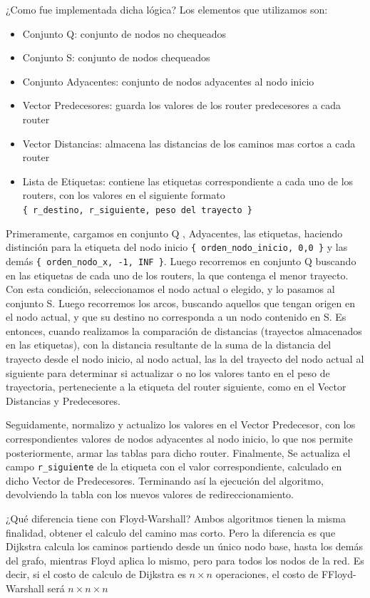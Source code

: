 \documentclass[12pt]{article} %
\begin{document}
¿Como fue implementada dicha lógica?  Los elementos  que utilizamos son:
\begin{itemize}
\item Conjunto Q: conjunto de nodos no chequeados
\item Conjunto S: conjunto de nodos chequeados
\item Conjunto Adyacentes: conjunto de nodos adyacentes al nodo inicio
\item Vector Predecesores: guarda los valores de los router predecesores a cada router
\item Vector Distancias: almacena las distancias de los caminos mas cortos a cada router
\item Lista de Etiquetas: contiene las etiquetas correspondiente a cada uno de los routers, con los valores en el siguiente formato \\
\verb+{ r_destino, r_siguiente, peso del trayecto }+
\end{itemize}

Primeramente, cargamos en conjunto Q , Adyacentes, las etiquetas, haciendo distinción para la etiqueta del nodo inicio \verb+{ orden_nodo_inicio, 0,0 }+ y las demás \verb+{ orden_nodo_x, -1, INF }+.
Luego recorremos en conjunto Q buscando en las etiquetas de cada uno de los routers, la que contenga el menor trayecto. Con esta condición, seleccionamos el nodo actual o elegido, y lo pasamos al conjunto S.
Luego recorremos los arcos, buscando aquellos que tengan origen en el nodo actual, y que su destino no corresponda a un nodo contenido en S. 
Es entonces, cuando realizamos la comparación de distancias (trayectos almacenados en las etiquetas), con la distancia resultante de la suma de la distancia del trayecto desde el nodo inicio, al nodo actual, las la del trayecto del nodo actual al siguiente para determinar si actualizar o no los valores tanto en el peso de trayectoria, perteneciente a la etiqueta del router siguiente,  como en el Vector Distancias y Predecesores.

Seguidamente, normalizo y actualizo los valores en el Vector Predecesor, con los correspondientes valores de nodos adyacentes al nodo inicio, lo que nos permite posteriormente, armar las tablas para dicho router.
Finalmente, Se actualiza el campo \verb+r_siguiente+ de la etiqueta con el valor correspondiente,  calculado en dicho Vector de Predecesores. Terminando así la ejecución del algoritmo, devolviendo la tabla con los nuevos valores de redireccionamiento.
 
¿Qué diferencia tiene con Floyd-Warshall? Ambos algoritmos tienen la misma finalidad, obtener el calculo del camino mas corto. Pero la diferencia es que Dijkstra calcula los caminos partiendo desde un único nodo base, hasta los demás del grafo, mientras Floyd aplica lo mismo, pero para todos los nodos de la red.
Es decir, si el costo de calculo de Dijkstra es $n \times n$  operaciones, el costo de FFloyd-Warshall será $n \times n \times n$
\end{document}
